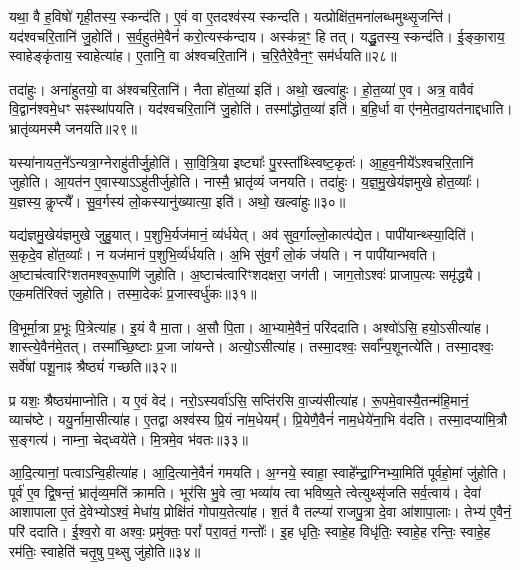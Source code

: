 यथा॒ वै ह॒विषो॑ गृही॒तस्य॒ स्कन्द॑ति।
ए॒वं वा ए॒तदश्व॑स्य स्कन्दति।
यत्प्रोक्षि॑त॒मना॑लब्धमुथ्सृ॒जन्ति॑।
यद॑श्वचरि॒तानि॑ जु॒होति॑।
स॒र्व॒हुत॑मे॒वैनं॑ करो॒त्यस्क॑न्दाय।
अस्क॑न्न॒ꣳ॒ हि तत्।
यद्धु॒तस्य॒ स्कन्द॑ति।
ई॒ङ्का॒राय॒ स्वाहेङ्कृ॑ताय॒ स्वाहेत्या॑ह।
ए॒तानि॒ वा अ॑श्वचरि॒तानि॑।
च॒रि॒तैरे॒वैन॒ꣳ॒ सम॑र्धयति॥२८॥\ip

तदा॑हुः।
अना॑हुतयो॒ वा अ॑श्वचरि॒तानि॑।
नैता हो॑त॒व्या॑ इति॑।
अथो॒ खल्वा॑हुः।
हो॒त॒व्या॑ ए॒व।
अत्र॒ वावैवं वि॒द्वान॑श्वमे॒धꣳ सꣴस्था॑पयति।
यद॑श्वचरि॒तानि॑ जु॒होति॑।
तस्मा᳚द्धोत॒व्या॑ इति॑।
ब॒हि॒र्धा वा ए॑नमे॒तदा॒यत॑नाद्दधाति।
भ्रातृ॑व्यमस्मै जनयति॥२९॥\ip

यस्या॑नायत॒ने᳚\-ऽन्यत्रा॒ग्नेराहु॑तीर्जु॒होति॑।
सा॒वि॒त्रि॒या इष्ट्याः᳚ पु॒रस्ता᳚थ्स्विष्ट॒कृतः॑।
आ॒ह॒व॒नीये᳚\-ऽश्वचरि॒तानि॑ जुहोति।
आ॒यत॑न ए॒वास्याऽऽहु॑तीर्जुहोति।
नास्मै॒ भ्रातृ॑व्यं जनयति।
तदा॑हुः।
य॒ज्ञ॒\-मु॒खेय॑ज्ञमुखे होत॒व्याः᳚।
य॒ज्ञस्य॒ कॢप्त्यै᳚।
सु॒व॒र्गस्य॑ लो॒कस्यानु॑ख्यात्या॒ इति॑।
अथो॒ खल्वा॑हुः॥३०॥\ip

यद्य॑ज्ञमु॒खेय॑ज्ञमुखे जुहु॒यात्।
प॒शुभि॒र्यज॑मानं॒ व्य॑र्धयेत्।
अव॑ सुव॒र्गाल्लो॒कात्प॑द्येत।
पापी॑यान्थ्स्या॒दिति॑।
स॒कृदे॒व हो॑त॒व्याः᳚।
न यज॑मानं प॒शुभि॒र्व्य॑र्धयति।
अ॒भि सु॑व॒र्गं लो॒कं ज॑यति।
न पापी॑यान्भवति।
अ॒ष्टाच॑त्वारिꣳशतमश्वरू॒पाणि॑ जुहोति।
अ॒ष्टाच॑त्वारिꣳशदक्षरा॒ जग॑ती।
जाग॒तो\-ऽश्वः॑ प्राजाप॒त्यः समृ॑द्ध्यै।
एक॒मति॑रिक्तं जुहोति।
तस्मा॒देकः॑ प्र॒जास्वर्धु॑कः॥३१॥\ip\anuvakamend[अ॒र्ध॒य॒ति॒ ज॒न॒य॒ति॒ खल्वा॑हु॒र्जग॑ती॒ त्रीणि॑ च]

वि॒भूर्मा॒त्रा प्र॒भूः पि॒त्रेत्या॑ह।
इ॒यं वै मा॒ता।
अ॒सौ पि॒ता।
आ॒भ्यामे॒वैनं॒ परि॑ददाति।
अश्वो॑ऽसि॒ हयो॒\-ऽसीत्या॑ह।
शास्त्ये॒वैन॑मे॒तत्।
तस्मा᳚च्छि॒ष्टाः प्र॒जा जा॑यन्ते।
अत्यो॒\-ऽसीत्या॑ह।
तस्मा॒दश्वः॒ सर्वा᳚न्प॒शूनत्ये॑ति।
तस्मा॒दश्वः॒ सर्वे॑षां पशू॒नाꣴ श्रैष्ठ्यं॑ गच्छति॥३२॥\ip

प्र यशः॒ श्रैष्ठ्य॑माप्नोति।
य ए॒वं वेद॑।
नरो॒ऽस्यर्वा॑ऽसि॒ सप्ति॑रसि वा॒ज्य॑सीत्या॑ह।
रू॒पमे॒वास्यै॒तन्म॑हि॒मानं॒ व्याच॑ष्टे।
ययु॒र्नामा॒सीत्या॑ह।
ए॒तद्वा अश्व॑स्य प्रि॒यं ना॑म॒धेयम्᳚।
प्रि॒येणै॒वैनं॑ नाम॒धेये॑ना॒भि व॑दति।
तस्मा॒दप्या॑मि॒त्रौ स॒ङ्गत्य॑।
नाम्ना॒ चेद्‌ध्वये॑ते।
मि॒त्रमे॒व भ॑वतः॥३३॥\ip

आ॒दि॒त्यानां॒ पत्वा\-ऽन्वि॒हीत्या॑ह।
आ॒दि॒त्याने॒वैनं॑ गमयति।
अ॒ग्नये॒ स्वाहा॒ स्वाहे᳚न्द्रा॒ग्निभ्या॒मिति॑ पूर्वहो॒मां जु॑होति।
पूर्व॑ ए॒व द्वि॒षन्तं॒ भ्रातृ॑व्य॒मति॑ क्रामति।
भूर॑सि भु॒वे त्वा॒ भव्या॑य त्वा भविष्य॒ते त्वेत्युथ्सृ॑जति सर्व॒त्वाय॑।
देवा॑ आशापाला ए॒तं दे॒वेभ्यो\-ऽश्वं॒ मेधा॑य॒ प्रोक्षि॑तं गोपाय॒तेत्या॑ह।
श॒तं वै तल्प्या॑ राजपु॒त्रा दे॒वा आ॑शापा॒लाः।
तेभ्य॑ ए॒वैनं॒ परि॑ ददाति।
ई॒श्व॒रो वा अश्वः॒ प्रमु॑क्तः॒ परां᳚ परा॒वतं॒ गन्तोः᳚।
इ॒ह धृतिः॒ स्वाहे॒ह विधृ॑तिः॒ स्वाहे॒ह रन्तिः॒ स्वाहे॒ह रम॑तिः॒ स्वाहेति॑ चतृ॒षु प॒थ्सु जु॑होति॥३४॥\ip

